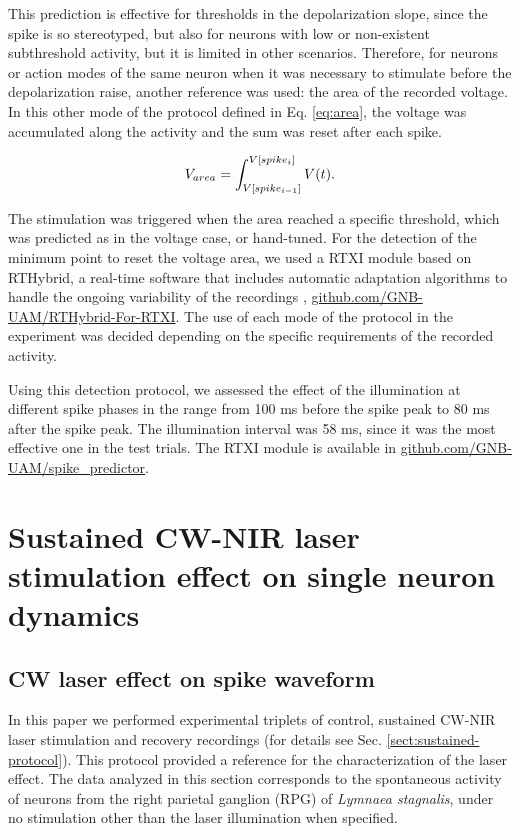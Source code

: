 This prediction is effective for thresholds in the depolarization slope, since the spike is so stereotyped, but also for neurons with low or non-existent subthreshold activity, but it is limited in other scenarios. Therefore, for neurons or action modes of the same neuron when it was necessary to stimulate before the depolarization raise, another reference was used: the area of the recorded voltage. In this other mode of the protocol defined in Eq. \ref{eq:area}, the voltage was accumulated along the activity and the sum was reset after each spike. 

\begin{equation}
    \centering 
    V_{area}=\int_{V[spike_{i-1}]}^{V[spike_{i}]}V(t).
    \label{eq:area}
\end{equation}

The stimulation was triggered when the area reached a specific threshold, which was predicted as in the voltage case, or hand-tuned. For the detection of the minimum point to reset the voltage area, we used a RTXI module based on RTHybrid, a real-time software that includes automatic adaptation algorithms to handle the ongoing variability of the recordings \cite{Amaducci2019,Reyes-Sanchez2020,REYESSANCHEZ2023}, \href{https://github.com/GNB-UAM/rthybrid-for-rtxi/tree/master/rthybrid_burst_analysis}{github.com/GNB-UAM/RTHybrid-For-RTXI}. The use of each mode of the protocol in the experiment was decided depending on the specific requirements of the recorded activity. 


Using this detection protocol, we assessed the effect of the illumination at different spike phases in the range from 100 ms before the spike peak to 80 ms after the spike peak. The illumination interval was 58 ms, since it was the most effective one in the test trials. The RTXI module is available in \href{https://github.com/GNB-UAM/spike_predictor}{github.com/GNB-UAM/spike\_predictor}.


\section{Sustained CW-NIR laser stimulation effect on single neuron dynamics}
\subsection{CW laser effect on spike waveform}
In this paper we performed experimental triplets of control, sustained CW-NIR laser stimulation and recovery recordings (for details see Sec. \ref{sect:sustained-protocol}). This protocol provided a reference for the characterization of the laser effect. The data analyzed in this section corresponds to the spontaneous activity of neurons from the right parietal ganglion (RPG) of \textit{Lymnaea stagnalis}, under no stimulation other than the laser illumination when specified.

